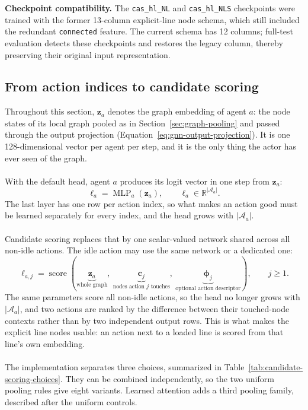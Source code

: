{\color{red}
\noindent\textbf{Checkpoint compatibility.}
The \texttt{cas\_hl\_NL} and \texttt{cas\_hl\_NLS} checkpoints were trained
with the former 13-column explicit-line node schema, which still included the
redundant \texttt{connected} feature. The current schema has 12 columns;
full-test evaluation detects these checkpoints and restores the legacy column,
thereby preserving their original input representation.
}

\subsection{From action indices to candidate scoring}
\label{subsec:candidate-motivation}

Throughout this section, $\mathbf{z}_a$ denotes the graph embedding of agent
$a$: the node states of its local graph pooled as in
Section~\ref{sec:graph-pooling} and passed through the output projection
(Equation~\ref{eq:gnn-output-projection}). It is one 128-dimensional vector per
agent per step, and it is the only thing the actor has ever seen of the graph.
\\
\\
With the default head, agent $a$ produces its logit vector in one step from
$\mathbf{z}_a$:
\begin{equation}
  \boldsymbol{\ell}_a = \operatorname{MLP}_a(\mathbf{z}_a),
  \qquad \boldsymbol{\ell}_a\in\mathbb{R}^{|\mathcal{A}_a|}.
  \label{eq:action-index-head}
\end{equation}
The last layer has one row per action index, so what makes an action good must
be learned separately for every index, and the head grows with
$|\mathcal{A}_a|$.
\\
\\
Candidate scoring replaces that by one scalar-valued network shared across all
non-idle actions. The idle action may use the same network or a dedicated one:
\begin{equation}
  \ell_{a,j} =
  \operatorname{score}
  \left(
    \underbrace{\mathbf{z}_a}_{\text{whole graph}},\
    \underbrace{\mathbf{c}_j}_{\text{nodes action }j\text{ touches}},\
    \underbrace{\boldsymbol{\phi}_j}_{\text{optional action descriptor}}
  \right),
  \qquad j\geq 1.
  \label{eq:candidate-scoring-head}
\end{equation}
The same parameters score all non-idle actions, so the head no longer grows with
$|\mathcal{A}_a|$, and two actions are ranked by the difference between their
touched-node contexts rather than by two independent output rows. This is what
makes the explicit line nodes usable: an action next to a loaded line is scored
from that line's own embedding.
\\
\\
The implementation separates three choices, summarized in
Table~\ref{tab:candidate-scoring-choices}. They can be combined independently,
so the two uniform pooling rules give eight variants. Learned attention adds a
third pooling family, described after the uniform controls.

